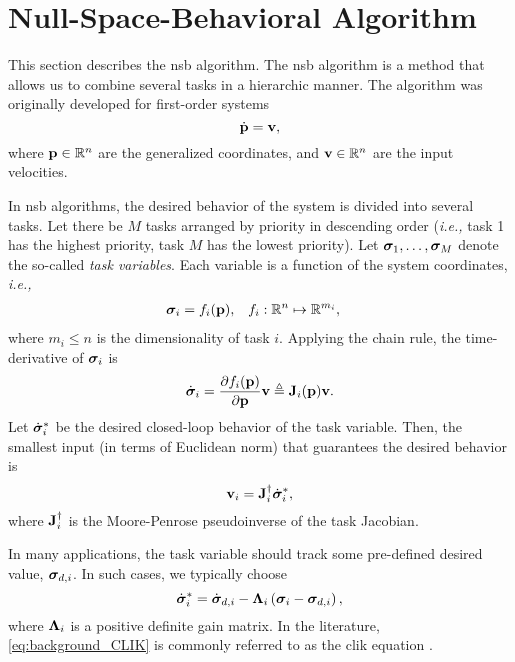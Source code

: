 \section{Null-Space-Behavioral Algorithm}
\label{sec:background_NSB}

This section describes the \acrfull{nsb} algorithm.
The \gls{nsb} algorithm is a method that allows us to combine several tasks in a hierarchic manner.
The algorithm was originally developed for first-order systems
\begin{equation}
    \dot{\mathbf{p}} = \mathbf{v},
\end{equation}
where $\mathbf{p} \in \mathbb{R}^n$ are the generalized coordinates, and $\mathbf{v} \in \mathbb{R}^n$ are the input velocities.

In \gls{nsb} algorithms, the desired behavior of the system is divided into several tasks.
Let there be $M$ tasks arranged by priority in descending order (\emph{i.e.,} task 1 has the highest priority, task $M$ has the lowest priority).
Let $\bm{\sigma}_1, \ldots, \bm{\sigma}_M$ denote the so-called \emph{task variables}.
Each variable is a function of the system coordinates, \emph{i.e.,}
\begin{align}
    \bm{\sigma}_i &= f_i(\mathbf{p}), &
    f_i &: \mathbb{R}^n \mapsto \mathbb{R}^{m_i},
\end{align}
where $m_i \leq n$ is the dimensionality of task $i$.
Applying the chain rule, the time-derivative of $\bm{\sigma}_i$ is
\begin{equation}
    \dot{\bm{\sigma}}_i = \frac{\partial f_i(\mathbf{p})}{\partial \mathbf{p}} \mathbf{v} \triangleq \mathbf{J}_i(\mathbf{p}) \mathbf{v}.
\end{equation}
Let $\dot{\bm{\sigma}}_i^{*}$ be the desired closed-loop behavior of the task variable.
Then, the smallest input (in terms of Euclidean norm) that guarantees the desired behavior is
\begin{equation}
    \mathbf{v}_i = \mathbf{J}_i^{\dagger} \dot{\bm{\sigma}}_i^{*},
    \label{eq:background_NSB_velocity_i}
\end{equation}
where $\mathbf{J}_i^{\dagger}$ is the Moore-Penrose pseudoinverse of the task Jacobian.

\begin{rmk*}
    In many applications, the task variable should track some pre-defined desired value, $\bm{\sigma}_{d, i}$.
    In such cases, we typically choose
    \begin{equation}
        \dot{\bm{\sigma}}_i^{*} = \dot{\bm{\sigma}}_{d, i} - \bm{\Lambda}_i \left(\bm{\sigma}_i - \bm{\sigma}_{d,i}\right),  
        \label{eq:background_CLIK}  
    \end{equation}
    where $\bm{\Lambda}_i$ is a positive definite gain matrix.
    In the literature, \eqref{eq:background_CLIK} is commonly referred to as the \gls{clik} equation \cite{antonelli_2006_kinematic}.
\end{rmk*}


